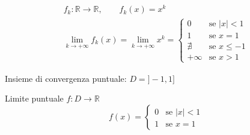 \begin{exbar}
	\begin{gather*}
	f_k: \mathbb{R} \rightarrow \mathbb{R}, \qquad f_k(x) = x^k
	\\
	\lim_{k \rightarrow + \infty} f_k(x) = \lim_{k \rightarrow + \infty} x^k =
	\begin{cases}
		0 & \text{se } |x|<1
		\\
		1 & \text{se } x=1 
		\\
		\nexists & \text{se } x \leq -1
		\\
		+\infty & \text{se } x >1
	\end{cases}
	\end{gather*}
	
	Insieme di convergenza puntuale: $D = ]-1,1]$
	
	Limite puntuale $f:D \rightarrow \mathbb{R}$		
	\begin{equation*} f(x) = \begin{cases}
		0 & \text{se } |x|<1
		\\
		1 & \text{se } x=1
	\end{cases}
	\end{equation*}	
\end{exbar}

